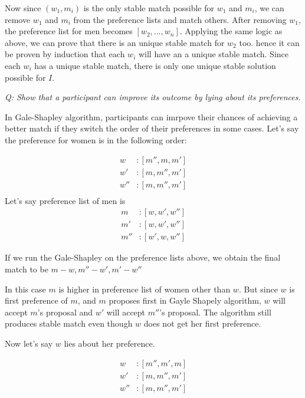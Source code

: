 \documentclass{homeworg}
\begin{document}
\begin{enumerate}[label=\alph*)]
Now since $(w_1,m_i)$ is the only stable match possible for $w_1$ and $m_i$, we can remove $w_1$ and $m_i$ from the preference lists and match others. After removing  $w_1$, the preference list for men becomes $[w_2,. .., w_n]$. Applying the same logic as above, we can prove that there is an unique stable match for $w_2$ too. hence it can be proven by induction that each $w_i$ will have an a unique stable match. Since each $w_i$ has a unique stable match, there is only one unique stable solution possible for $I$.

\end{enumerate}

\newpage

\exercise
\emph{Q: Show that a participant can improve its outcome by lying about its preferences.}

In Gale-Shapley algorithm, participants can imrpove their chances of achieving a better match if they switch the order of their preferences in some cases. Let's say the preference for women is in the following order:

\begin{align*}
    w &: [m'' , m , m']\\
    w'&: [m, m'', m']\\
    w''&:[m, m'', m']\\
\end{align*}
Let's say preference list of men is
\begin{align*}
    m &: [w , w' , w'']\\
    m'&:[w , w' , w'']\\
    m''&: [w', w, w'']
\end{align*}

If we run the Gale-Shapley on the preference lists above, we obtain the final match to be $m-w, m''-w', m'-w''$

In this case $m$ is higher in preference list of  women other than $w$. But since $w$ is first preference of $m$, and $m$ proposes first in Gayle Shapely algorithm, $w$  will accept $m$'s proposal and $w'$ will accept $m''$'s proposal. The algorithm still produces stable match even though $w$ does not get her first preference. 

Now let's say $w$ lies about her preference. 

\begin{align*}
    w &: [m'' , m' , m]\\
    w'&: [m, m'', m']\\
    w''&:[m, m'', m']\\
\end{align*}
\end{document}
